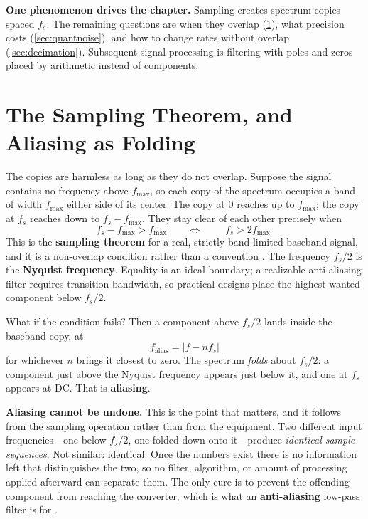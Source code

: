 \begin{controlsbox}
\textbf{One phenomenon drives the chapter.} Sampling creates spectrum copies spaced
\(f_s\). The remaining questions are when they overlap (\cref{sec:samplingthm}),
what precision costs (\cref{sec:quantnoise}), and how to change rates without
overlap (\cref{sec:decimation}). Subsequent signal processing is filtering with
poles and zeros placed by arithmetic instead of components.
\end{controlsbox}

\section{The Sampling Theorem, and Aliasing as Folding}
\label{sec:samplingthm}
The copies are harmless as long as they do not overlap. Suppose the signal contains no
frequency above \(f_{\max}\), so each copy of the spectrum occupies a band of width
\(f_{\max}\) either side of its center. The copy at \(0\) reaches up to \(f_{\max}\);
the copy at \(f_s\) reaches down to \(f_s-f_{\max}\). They stay clear of each other
precisely when
\[
f_s-f_{\max}>f_{\max}
\qquad\Longleftrightarrow\qquad
\boxed{\;f_s>2f_{\max}\;}
\]
This is the \textbf{sampling theorem} for a real, strictly band-limited baseband
signal, and it is a non-overlap condition rather than a convention
\cite[pp.~23--25]{giannini2008baseband}. The frequency \(f_s/2\) is the
\textbf{Nyquist frequency}. Equality is an ideal boundary; a realizable
anti-aliasing filter requires transition bandwidth, so practical designs place the
highest wanted component below \(f_s/2\).

What if the condition fails? Then a component above \(f_s/2\) lands inside the
baseband copy, at
\[
f_{\text{alias}}=\bigl|f-nf_s\bigr|
\]
for whichever \(n\) brings it closest to zero. The spectrum \emph{folds} about
\(f_s/2\): a component just above the Nyquist frequency appears just below it, and one
at \(f_s\) appears at DC. That is \textbf{aliasing}.

\begin{mistakebox}
\textbf{Aliasing cannot be undone.} This is the point that matters, and it follows from
the sampling operation rather than from the equipment. Two different input
frequencies---one below \(f_s/2\), one folded down onto it---produce \emph{identical
sample sequences}. Not similar: identical. Once the numbers exist there is no
information left that distinguishes the two, so no filter, algorithm, or amount of
processing applied afterward can separate them. The only cure is to prevent the
offending component from reaching the converter, which is what an
\textbf{anti-aliasing} low-pass filter is for
\cite[pp.~23--25]{giannini2008baseband}.
\end{mistakebox}

